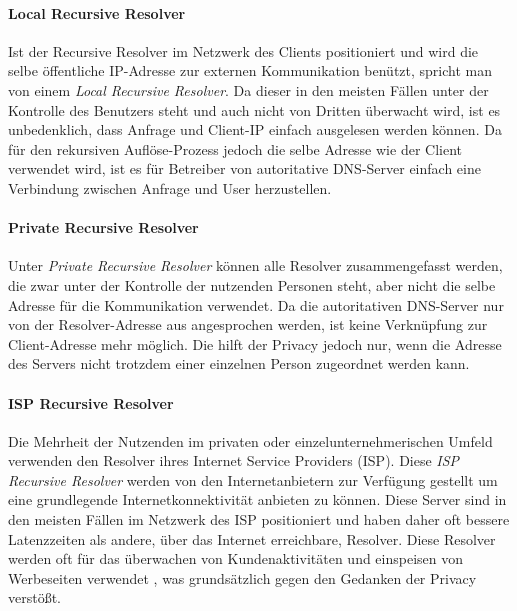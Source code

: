 \paragraph{Local Recursive Resolver}
Ist der Recursive Resolver im Netzwerk des Clients positioniert und wird die selbe öffentliche IP-Adresse zur externen Kommunikation benützt, spricht man von einem \textit{Local Recursive Resolver}. Da dieser in den meisten Fällen unter der Kontrolle des Benutzers steht und auch nicht von Dritten überwacht wird, ist es unbedenklich, dass Anfrage und Client-IP einfach ausgelesen werden können. Da für den rekursiven Auflöse-Prozess jedoch die selbe Adresse wie der Client verwendet wird, ist es für Betreiber von autoritative DNS-Server einfach eine Verbindung zwischen Anfrage und User herzustellen.  

\paragraph{Private Recursive Resolver}
Unter \textit{Private Recursive Resolver} können alle Resolver zusammengefasst werden, die zwar unter der Kontrolle der nutzenden Personen steht, aber nicht die selbe Adresse für die Kommunikation verwendet. Da die autoritativen DNS-Server nur von der Resolver-Adresse aus angesprochen werden, ist keine Verknüpfung zur Client-Adresse mehr möglich. Die hilft der Privacy jedoch nur, wenn die Adresse des Servers nicht trotzdem einer einzelnen Person zugeordnet werden kann.

\paragraph{ISP Recursive Resolver}
Die Mehrheit der Nutzenden im privaten oder einzelunternehmerischen Umfeld verwenden den Resolver ihres Internet Service Providers (ISP). Diese \textit{ISP Recursive Resolver} werden von den Internetanbietern zur Verfügung gestellt um eine grundlegende Internetkonnektivität anbieten zu können. Diese Server sind in den meisten Fällen im Netzwerk des ISP positioniert und haben daher oft bessere Latenzzeiten als andere, über das Internet erreichbare, Resolver. Diese Resolver werden oft für das überwachen von Kundenaktivitäten und einspeisen von Werbeseiten verwendet \cite{Weaver2011}, was grundsätzlich gegen den Gedanken der Privacy verstößt.

